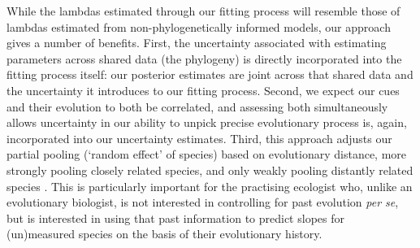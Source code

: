 \documentclass[11pt]{article}
\begin{document}
While the lambdas estimated through our fitting process will resemble those of lambdas estimated from non-phylogenetically informed models, our approach gives a number of benefits. First, the uncertainty associated with estimating parameters across shared data (the phylogeny) is directly incorporated into the fitting process itself: our posterior estimates are joint across that shared data and the uncertainty it introduces to our fitting process. Second, we expect our cues and their evolution to both be correlated, and assessing both simultaneously allows uncertainty in our ability to unpick precise evolutionary process is, again, incorporated into our uncertainty estimates. Third, this approach adjusts our partial pooling (`random effect' of species) based on evolutionary distance, more strongly pooling closely related species, and only weakly pooling distantly related species \citep[see Gaussian process models in][]{BDA}. This is particularly important for the practising ecologist who, unlike an evolutionary biologist, is not interested in controlling for past evolution \emph{per se}, but is interested in using that past information to predict slopes for (un)measured species on the basis of their evolutionary history.

\end{document}
